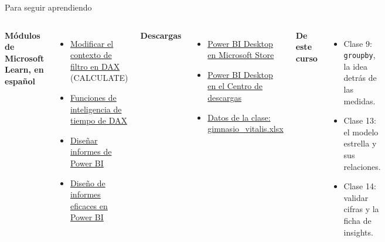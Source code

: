 \documentclass[aspectratio=169,11pt]{beamer}
\newcommand{\urlstore}{https://apps.microsoft.com/detail/9ntxr16hnw1t?hl=es-co}
\newcommand{\urlcentro}{https://www.microsoft.com/download/details.aspx?id=58494}
\newcommand{\urldatos}{https://github.com/craljimenez/An-lisis_y_Visualizacion_de_Datos_para_la_Toma_de_Decisiones/raw/main/clases/semana08-clase15-identificacion-insights-kpi-filtros/datos/gimnasio_vitalis.xlsx}
\begin{document}
\begin{frame}[t]{Para seguir aprendiendo}
  \footnotesize
  \begin{columns}[T,onlytextwidth]
    \textbf{Módulos de Microsoft Learn, en español}
    \begin{itemize}
      \footnotesize
      \item \href{https://learn.microsoft.com/es-es/training/modules/dax-power-bi-modify-filter/}{\color{esumerOrange}Modificar el contexto de filtro en DAX} (CALCULATE)
      \item \href{https://learn.microsoft.com/es-es/training/modules/dax-power-bi-time-intelligence/}{\color{esumerOrange}Funciones de inteligencia de tiempo de DAX}
      \item \href{https://learn.microsoft.com/es-es/training/modules/power-bi-effective-reports/}{\color{esumerOrange}Diseñar informes de Power BI}
      \item \href{https://learn.microsoft.com/es-es/training/modules/visuals-in-power-bi/}{\color{esumerOrange}Diseño de informes eficaces en Power BI}
    \end{itemize}
    \textbf{Descargas}
    \begin{itemize}
      \footnotesize
      \item \href{\urlstore}{\color{esumerOrange}Power BI Desktop en Microsoft Store}
      \item \href{\urlcentro}{\color{esumerOrange}Power BI Desktop en el Centro de descargas}
      \item \href{\urldatos}{\color{esumerOrange}Datos de la clase: gimnasio\_vitalis.xlsx}
    \end{itemize}
    \textbf{De este curso}
    \begin{itemize}
      \footnotesize
      \item Clase 9: \texttt{groupby}, la idea detrás de las medidas.
      \item Clase 13: el modelo estrella y sus relaciones.
      \item Clase 14: validar cifras y la ficha de insights.
    \end{itemize}
  \end{columns}
\end{frame}
\end{document}
